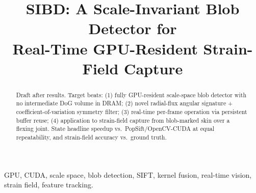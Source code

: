 \documentclass[conference]{IEEEtran}
\begin{document}
\title{SIBD: A Scale-Invariant Blob Detector for\\
Real-Time GPU-Resident Strain-Field Capture}

\author{
}

\maketitle

\begin{abstract}
\begin{fillbox}
Draft after results. Target beats: (1) fully GPU-resident scale-space blob
detector with no intermediate DoG volume in DRAM; (2) novel radial-flux
angular signature + coefficient-of-variation symmetry filter; (3) real-time
per-frame operation via persistent buffer reuse; (4) application to strain-field
capture from blob-marked skin over a flexing joint. State headline
speedup vs.\ PopSift/OpenCV-CUDA at equal repeatability, and strain-field
accuracy vs.\ ground truth.
\end{fillbox}
\end{abstract}

\begin{IEEEkeywords}
GPU, CUDA, scale space, blob detection, SIFT, kernel fusion, real-time vision,
strain field, feature tracking.
\end{IEEEkeywords}


\end{document}
